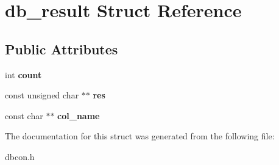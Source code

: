 \hypertarget{structdb__result}{}\section{db\+\_\+result Struct Reference}
\label{structdb__result}
\subsection*{Public Attributes}
\begin{DoxyCompactItemize}
\item 
\mbox{\label{structdb__result_a4c20dbe82a9d2d7d19d53eaf07148604}} 
int {\bfseries count}
\item 
\mbox{\label{structdb__result_af89d1ba59f1bbcb8051f542c2f638911}} 
const unsigned char $\ast$$\ast$ {\bfseries res}
\item 
\mbox{\label{structdb__result_a399663fc0c7a75275e73df839022bfc5}} 
const char $\ast$$\ast$ {\bfseries col\+\_\+name}
\end{DoxyCompactItemize}


The documentation for this struct was generated from the following file\+:\begin{DoxyCompactItemize}
\item 
dbcon.\+h\end{DoxyCompactItemize}

